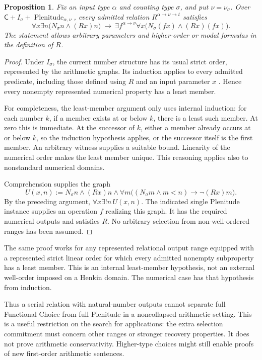 \documentclass[11pt]{article}
\newcommand{\C}{\mathsf C}
\newtheorem{proposition}{Proposition}
\begin{document}
\begin{proposition}\label{numericchoice}
Fix an input type $\alpha$ and counting type $\sigma$, and put $\nu=\nu_\sigma$. Over $\C+I_\sigma+\operatorname{Plenitude}_{\alpha,\nu}$, every admitted relation $R^{\alpha\to\nu\to t}$ satisfies
\[
 \forall x\exists n\bigl(N_\sigma n\land (Rx)n\bigr)
 \ \longrightarrow\
 \exists f^{\alpha\to\nu}\forall x
          \bigl(N_\sigma(fx)\land(Rx)(fx)\bigr).
\]
The statement allows arbitrary parameters and higher-order or modal formulas in the definition of $R$.
\end{proposition}
\begin{proof}
Under $I_\sigma$, the current number structure has its usual strict order, represented by the arithmetic graphs. Its induction applies to every admitted predicate, including those defined using $R$ and an input parameter $x$ \cite[\S\S29,32.1]{coding}. Hence every nonempty represented numerical property has a least member.

For completeness, the least-member argument only uses internal induction: for each number $k$, if a member exists at or below $k$, there is a least such member. At zero this is immediate. At the successor of $k$, either a member already occurs at or below $k$, so the induction hypothesis applies, or the successor itself is the first member. An arbitrary witness supplies a suitable bound. Linearity of the numerical order makes the least member unique. This reasoning applies also to nonstandard numerical domains.

Comprehension supplies the graph
\[
 U(x,n):=N_\sigma n\land(Rx)n\land
   \forall m\bigl((N_\sigma m\land m<n)\to\neg(Rx)m\bigr).
\]
By the preceding argument, $\forall x\exists!n\,U(x,n)$. The indicated single Plenitude instance supplies an operation $f$ realizing this graph. It has the required numerical outputs and satisfies $R$. No arbitrary selection from non-well-ordered ranges has been assumed.
\end{proof}

The same proof works for any represented relational output range equipped with a represented strict linear order for which every admitted nonempty subproperty has a least member. This is an internal least-member hypothesis, not an external well-order imposed on a Henkin domain. The numerical case has that hypothesis from induction.

Thus a serial relation with natural-number outputs cannot separate full Functional Choice from full Plenitude in a noncollapsed arithmetic setting. This is a useful restriction on the search for applications: the extra selection commitment must concern other ranges or stronger recovery properties. It does not prove arithmetic conservativity. Higher-type choices might still enable proofs of new first-order arithmetic sentences.
\end{document}
